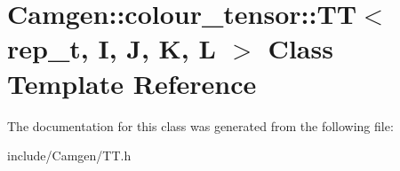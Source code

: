 \hypertarget{a00530}{\section{Camgen\-:\-:colour\-\_\-tensor\-:\-:T\-T$<$ rep\-\_\-t, I, J, K, L $>$ Class Template Reference}
\label{a00530}
}


The documentation for this class was generated from the following file\-:\begin{DoxyCompactItemize}
\item 
include/\-Camgen/T\-T.\-h\end{DoxyCompactItemize}
